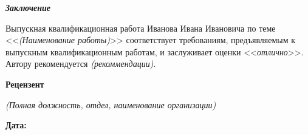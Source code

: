 \documentclass[12pt, a4paper, titlepage]{extarticle}
\begin{document}
	\textbf{\textit{Заключение}}

		Выпускная квалификационная работа Иванова Ивана Ивановича по теме <<\textit{(Наименование работы)}>> соответствует требованиям, предъявляемым к выпускным квалификационным работам, и заслуживает оценки <<\textit{отлично}>>. Автору рекомендуется \textit{(рекоммендации)}.

	\textbf{Рецензент}

	\noindent \textit{(Полная должность, отдел, наименование организации)}

	\vspace{10pt}

	\hfill {}

	\vspace{15pt}
	\textbf{Дата:} 

	\vspace{40pt}
\end{document}
